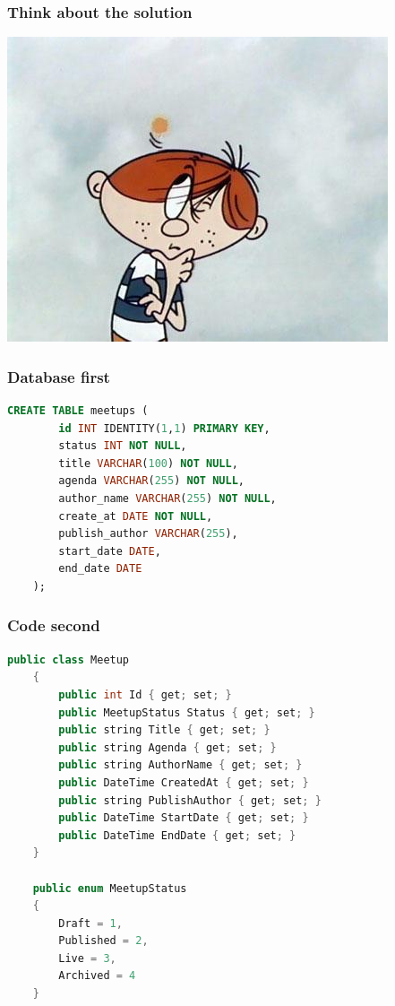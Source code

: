 \documentclass{beamer}
\begin{document}
\begin{frame}
\frametitle{\textbf{Think about the solution}}

\includegraphics[height=.8\textheight]{dobromir.jpg}

\end{frame}

\begin{frame}[fragile]
\frametitle{\textbf{Database first}}

\begin{lstlisting}[language=SQL]
    CREATE TABLE meetups (
        id INT IDENTITY(1,1) PRIMARY KEY,
        status INT NOT NULL,
        title VARCHAR(100) NOT NULL,
        agenda VARCHAR(255) NOT NULL,
        author_name VARCHAR(255) NOT NULL,
        create_at DATE NOT NULL,
        publish_author VARCHAR(255),
        start_date DATE,
        end_date DATE
    );
\end{lstlisting}

\end{frame}

\begin{frame}[fragile]
\frametitle{\textbf{Code second}}

\begin{lstlisting}[language=Java]
    public class Meetup
    {
        public int Id { get; set; }
        public MeetupStatus Status { get; set; }
        public string Title { get; set; }
        public string Agenda { get; set; }
        public string AuthorName { get; set; }
        public DateTime CreatedAt { get; set; }
        public string PublishAuthor { get; set; }
        public DateTime StartDate { get; set; }
        public DateTime EndDate { get; set; }
    }

    public enum MeetupStatus
    {
        Draft = 1,
        Published = 2,
        Live = 3,
        Archived = 4
    }
\end{lstlisting}

\end{frame}
\end{document}
